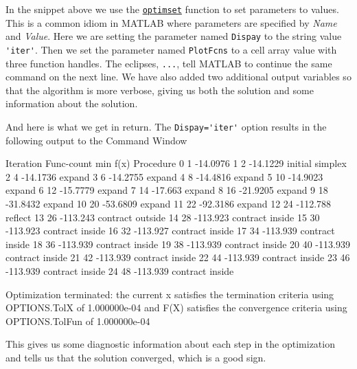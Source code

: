 \documentclass[../../book.tex]{subfiles}
\begin{document}
In the snippet above we use the \href{https://www.mathworks.com/help/matlab/ref/optimset.html}{\lstinline{optimset}} function to set parameters to values.  This is a common idiom in MATLAB where parameters are specified by \emph{Name} and \emph{Value}.  Here we are setting the parameter named \lstinline{Dispay} to the string value \lstinline{'iter'}.  Then we set the parameter named \lstinline{PlotFcns} to a cell array value with three function handles.  The eclipses, \lstinline{...}, tell MATLAB to continue the same command on the next line.  We have also added two additional output variables so that the algorithm is more verbose, giving us both the solution and some information about the solution.

And here is what we get in return.  The \lstinline{Dispay='iter'} option results in the following output to the Command Window
\begin{stdout}
    Iteration   Func-count     min f(x)         Procedure
     0            1         -14.0976         
     1            2         -14.1229         initial simplex
     2            4         -14.1736         expand
     3            6         -14.2755         expand
     4            8         -14.4816         expand
     5           10         -14.9023         expand
     6           12         -15.7779         expand
     7           14          -17.663         expand
     8           16         -21.9205         expand
     9           18         -31.8432         expand
    10           20         -53.6809         expand
    11           22         -92.3186         expand
    12           24         -112.788         reflect
    13           26         -113.243         contract outside
    14           28         -113.923         contract inside
    15           30         -113.923         contract inside
    16           32         -113.927         contract inside
    17           34         -113.939         contract inside
    18           36         -113.939         contract inside
    19           38         -113.939         contract inside
    20           40         -113.939         contract inside
    21           42         -113.939         contract inside
    22           44         -113.939         contract inside
    23           46         -113.939         contract inside
    24           48         -113.939         contract inside
 
Optimization terminated:
 the current x satisfies the termination criteria using OPTIONS.TolX of 1.000000e-04 
 and F(X) satisfies the convergence criteria using OPTIONS.TolFun of 1.000000e-04 
\end{stdout}
This gives us some diagnostic information about each step in the optimization and tells us that the solution converged, which is a good sign.
\end{document}
